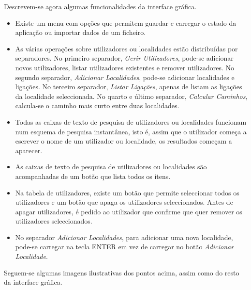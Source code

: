 \documentclass[a5paper,twocolumn, 11pt]{article}
\begin{document}
Descrevem-se agora algumas funcionalidades da interface gráfica.
\begin{itemize}
\item{Existe um menu com opções que permitem guardar e carregar o estado da aplicação ou importar dados de um ficheiro.}


\item{As várias operações sobre utilizadores ou localidades estão distribuídas por separadores. No primeiro separador, \emph{Gerir Utilizadores}, pode-se adicionar novos utilizadores, listar utilizadores existentes e remover utilizadores. No segundo separador, \emph{Adicionar Localidades}, pode-se adicionar localidades e ligações. No terceiro separador, \emph{Listar Ligações}, apenas de listam as ligações da localidade seleccionada. No quarto e último separador, \emph{Calcular Caminhos}, calcula-se o caminho mais curto entre duas localidades.}

\item{Todas as caixas de texto de pesquisa de utilizadores ou localidades funcionam num esquema de pesquisa instantânea, isto é, assim que o utilizador começa a escrever o nome de um utilizador ou localidade, os resultados começam a aparecer.}

\item{As caixas de texto de pesquisa de utilizadores ou localidades são acompanhadas de um botão que lista todos os itens.}

\item{Na tabela de utilizadores, existe um botão que permite seleccionar todos os utilizadores e um botão que apaga os utilizadores seleccionados. Antes de apagar utilizadores, é pedido ao utilizador que confirme que quer remover os utilizadores seleccionados.}

\item{No separador \emph{Adicionar Localidades}, para adicionar uma nova localidade, pode-se carregar na tecla ENTER em vez de carregar no botão \emph{Adicionar Localidade}.}
\end{itemize}

Seguem-se algumas imagens ilustrativas dos pontos acima, assim como do resto da interface gráfica.
\end{document}
